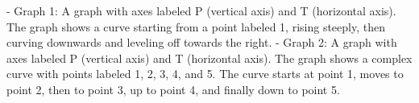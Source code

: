 - Graph 1: A graph with axes labeled P (vertical axis) and T (horizontal axis). The graph shows a curve starting from a point labeled 1, rising steeply, then curving downwards and leveling off towards the right.
- Graph 2: A graph with axes labeled P (vertical axis) and T (horizontal axis). The graph shows a complex curve with points labeled 1, 2, 3, 4, and 5. The curve starts at point 1, moves to point 2, then to point 3, up to point 4, and finally down to point 5.